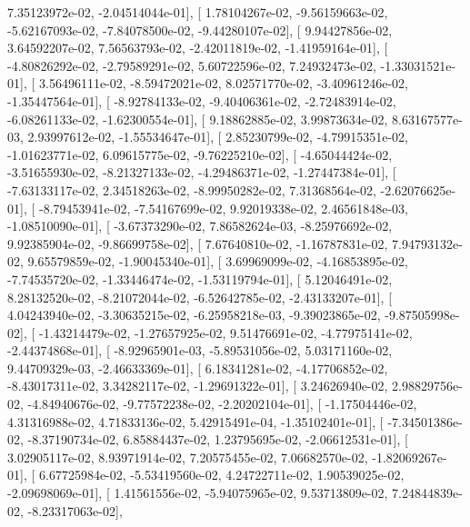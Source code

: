 \documentclass{article}
\begin{document}
          7.35123972e-02,  -2.04514044e-01],
       [  1.78104267e-02,  -9.56159663e-02,  -5.62167093e-02,
         -7.84078500e-02,  -9.44280107e-02],
       [  9.94427856e-02,   3.64592207e-02,   7.56563793e-02,
         -2.42011819e-02,  -1.41959164e-01],
       [ -4.80826292e-02,  -2.79589291e-02,   5.60722596e-02,
          7.24932473e-02,  -1.33031521e-01],
       [  3.56496111e-02,  -8.59472021e-02,   8.02571770e-02,
         -3.40961246e-02,  -1.35447564e-01],
       [ -8.92784133e-02,  -9.40406361e-02,  -2.72483914e-02,
         -6.08261133e-02,  -1.62300554e-01],
       [  9.18862885e-02,   3.99873634e-02,   8.63167577e-03,
          2.93997612e-02,  -1.55534647e-01],
       [  2.85230799e-02,  -4.79915351e-02,  -1.01623771e-02,
          6.09615775e-02,  -9.76225210e-02],
       [ -4.65044424e-02,  -3.51655930e-02,  -8.21327133e-02,
         -4.29486371e-02,  -1.27447384e-01],
       [ -7.63133117e-02,   2.34518263e-02,  -8.99950282e-02,
          7.31368564e-02,  -2.62076625e-01],
       [ -8.79453941e-02,  -7.54167699e-02,   9.92019338e-02,
          2.46561848e-03,  -1.08510090e-01],
       [ -3.67373290e-02,   7.86582624e-03,  -8.25976692e-02,
          9.92385904e-02,  -9.86699758e-02],
       [  7.67640810e-02,  -1.16787831e-02,   7.94793132e-02,
          9.65579859e-02,  -1.90045340e-01],
       [  3.69969099e-02,  -4.16853895e-02,  -7.74535720e-02,
         -1.33446474e-02,  -1.53119794e-01],
       [  5.12046491e-02,   8.28132520e-02,  -8.21072044e-02,
         -6.52642785e-02,  -2.43133207e-01],
       [  4.04243940e-02,  -3.30635215e-02,  -6.25958218e-03,
         -9.39023865e-02,  -9.87505998e-02],
       [ -1.43214479e-02,  -1.27657925e-02,   9.51476691e-02,
         -4.77975141e-02,  -2.44374868e-01],
       [ -8.92965901e-03,  -5.89531056e-02,   5.03171160e-02,
          9.44709329e-03,  -2.46633369e-01],
       [  6.18341281e-02,  -4.17706852e-02,  -8.43017311e-02,
          3.34282117e-02,  -1.29691322e-01],
       [  3.24626940e-02,   2.98829756e-02,  -4.84940676e-02,
         -9.77572238e-02,  -2.20202104e-01],
       [ -1.17504446e-02,   4.31316988e-02,   4.71833136e-02,
          5.42915491e-04,  -1.35102401e-01],
       [ -7.34501386e-02,  -8.37190734e-02,   6.85884437e-02,
          1.23795695e-02,  -2.06612531e-01],
       [  3.02905117e-02,   8.93971914e-02,   7.20575455e-02,
          7.06682570e-02,  -1.82069267e-01],
       [  6.67725984e-02,  -5.53419560e-02,   4.24722711e-02,
          1.90539025e-02,  -2.09698069e-01],
       [  1.41561556e-02,  -5.94075965e-02,   9.53713809e-02,
          7.24844839e-02,  -8.23317063e-02],
\end{document}
